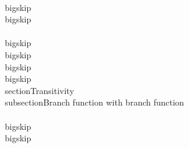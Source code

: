 \\bigskip
\\bigskip
\\[, \\Bb{if(i \\Pe j)}{,}{,m \\Pe n,}, \\Rq , \\Bb{if(m \\Pe n)}{,}{,i \\Pe j,},\\]


\\bigskip
\\bigskip
\\bigskip
\\bigskip
\\section{Transitivity}
\\subsection{Branch function with branch function}
\\[, \\Bb{if(i \\Pe j)}{,\\Tc c_1,}{,\\Tc c_2,}, \\Rq , \\Bb{if(i \\Pe j)}{,\\Bb{if(i \\Pe j)}{,\\Tc c_1,}{,\\Tc c_3,},}{,\\Tc c_2,},\\]

\\bigskip
\\bigskip
\\[, \\Bb{if(i \\Pe j)}{,\\Tc c_1,}{,\\Tc c_2,}, \\Rq , \\Bb{if(i \\Pe j)}{,\\Tc c_1,}{,\\Bb{if(i \\Pe j)}{,\\Tc c_3,}{,\\Tc c_2,},},\\]


